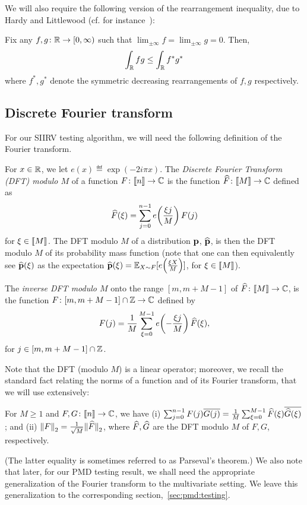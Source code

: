 We will also require the following version of the rearrangement inequality, due to Hardy and Littlewood (cf. for instance~\cite[Theorem 2.2]{BennettS:88}):
  \begin{theorem}\label{theo:hardy:littlewood}
    Fix any $f,g\colon\mathbb{R}\to [0,\infty)$ such that $\lim_{\pm\infty} f = \lim_{\pm\infty} g = 0$. Then,
    \[
        \int_{\mathbb{R}} fg \leq \int_{\mathbb{R}} f^\ast g^\ast
    \]
    where $f^\ast, g^\ast$ denote the symmetric decreasing rearrangements of $f,g$ respectively.
  \end{theorem}
  
\subsection{Discrete Fourier transform}
For our SIIRV testing algorithm, we will need the following definition of the Fourier transform. 

\begin{definition}
For $x \in \mathbb{R}$, we let $e(x) \eqdef  \exp(-2i\pi x)$. The \emph{Discrete Fourier Transform (DFT) modulo $M$} of a function
$F\colon\llbracket n\rrbracket \to \mathbb{C}$ is  the function $\widehat{F}\colon\llbracket M\rrbracket\to \mathbb{C}$ defined as
\[
    \widehat{F}(\xi)=\sum_{j=0}^{n-1} e\!\left(\frac{\xi j}{M}\right) F(j)
\]
for $\xi \in \llbracket M\rrbracket$. The DFT modulo $M$ of a distribution $\mathbf{p}$, $\widehat{\mathbf{p}}$, is then the DFT modulo $M$ of its probability mass function (note that one can then equivalently see $\widehat{\mathbf{p}}(\xi)$ as the expectation $\widehat{\mathbf{p}}(\xi) = \mathbb{E}_{X\sim F}[e\!\left(\frac{\xi X}{M}\right)]$, for $\xi\in\llbracket M\rrbracket$).

The \emph{inverse DFT modulo $M$} onto the range $[m,m+M-1]$ of $\widehat{F}\colon \llbracket M\rrbracket \to \mathbb{C}$, is the function $F\colon [m, m+M-1] \cap \mathbb{Z} \to \mathbb{C}$ defined by 
\[
    F(j)= \frac{1}{M} \sum_{\xi=0}^{M-1} e\!\left(-\frac{\xi j}{M}\right) \widehat{F}(\xi),
\]
for $j \in [m, m+M-1] \cap \mathbb{Z}$.
\end{definition}

Note that the DFT (modulo $M$) is a linear operator; moreover, we recall the standard fact relating the norms of a function and of its Fourier transform, that we will use extensively:
\begin{theorem}
For $M\geq 1$ and $F,G\colon\llbracket n\rrbracket \to \mathbb{C}$, we have (i) $\sum_{j=0}^{n-1} F(j)\overline{G(j)} =  \frac{1}{M}\sum_{\xi=0}^{M-1} \widehat{F}(\xi)\overline{\widehat{G}(\xi)}$; and (ii) ${\lVert F{\rVert}}_2= \frac{1}{\sqrt{M}}{\lVert\widehat{F}{\rVert}}_2$, 
where $\widehat{F},\widehat{G}$ are the DFT modulo $M$ of $F,G$, respectively.
\end{theorem}
\noindent(The latter equality is sometimes referred to as Parseval's theorem.) We also note that later, for our PMD testing result, we shall need the appropriate generalization of the Fourier transform to the multivariate setting. We leave this generalization to the corresponding section,~\cref{sec:pmd:testing}.

